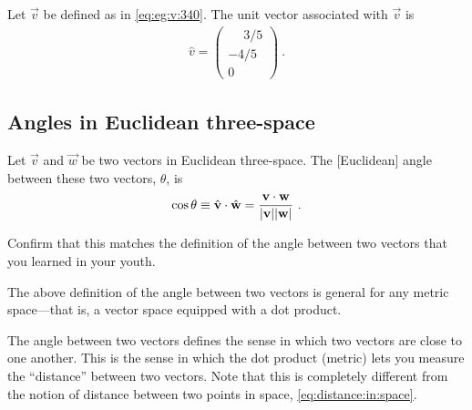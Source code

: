 \documentclass[12pt]{article}
\begin{document}
\begin{example}
Let $\vec{v}$ be defined as in \eqref{eq:eg:v:340}. The unit vector associated with $\vec{v}$ is
\begin{align}
    \hat{v} = 
    \begin{pmatrix}
        \phantom{+}3/5 \\
        -4/5\\
        0
    \end{pmatrix} \ .
\end{align}

\end{example}


\subsection{Angles in Euclidean three-space}

Let $\vec{v}$ and $\vec{w}$ be two vectors in Euclidean three-space. The [Euclidean] angle between these two vectors, $\theta$, is 
\begin{align}
    \cos\theta \equiv {\hat{\mathbf{v}}}\cdot{\hat{\mathbf{w}}} = \frac{\mathbf{v}\cdot\mathbf{w}}{|\mathbf{v}||\mathbf{w}|} \ .
\end{align}
\label{eq:cos:theta:in:R3}
\begin{exercise}
Confirm that this matches the definition of the angle between two vectors that you learned in your youth.
\end{exercise}
The above definition of the angle between two vectors is general for any metric space---that is, a vector space equipped with a dot product. 

\begin{example}
The angle between two vectors defines the sense in which two vectors are close to one another. This is the sense in which the dot product (metric) lets you measure the ``distance'' between two vectors. Note that this is completely different from the notion of distance between two points in space, \eqref{eq:distance:in:space}. 
\end{example}
\end{document}
